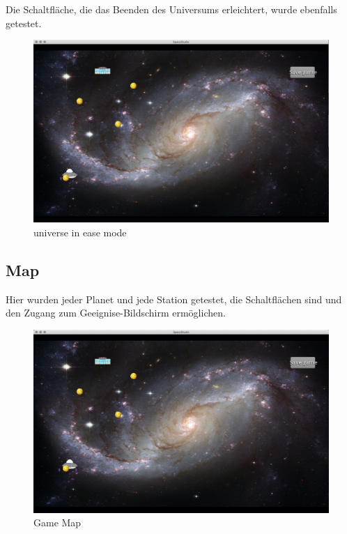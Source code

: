 \documentclass[11pt]{article}
\begin{document}
Die Schaltfläche, die das Beenden des Universums erleichtert, wurde ebenfalls getestet.\\

\begin{figure}[t]
\centering
\includegraphics[scale=0.3]{TestProtocolBilder/universeEase.png}
\caption{universe in ease mode}
\end{figure}

\newpage
\subsection{Map}

Hier wurden jeder Planet und jede Station getestet, die Schaltflächen sind und den Zugang zum Geeignise-Bildschirm ermöglichen.\\
\begin{figure}
\centering
\includegraphics[scale=0.3]{TestProtocolBilder/map.png}
\caption{Game Map}
\end{figure}
\newpage
\end{document}
